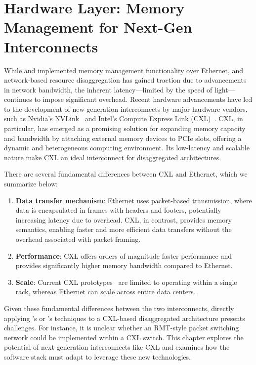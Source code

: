 \chapter{Hardware Layer: Memory Management for Next-Gen Interconnects}
\label{chap:hardware}
While \mind and \pulse implemented memory management functionality over Ethernet, and network-based resource disaggregation has gained traction due to advancements in network bandwidth, the inherent latency—limited by the speed of light—continues to impose significant overhead. Recent hardware advancements have led to the development of new-generation interconnects by major hardware vendors, such as Nvidia's NVLink~\cite{nvlink} and Intel's Compute Express Link (CXL)~\cite{cxl}. CXL, in particular, has emerged as a promising solution for expanding memory capacity and bandwidth by attaching external memory devices to PCIe slots, offering a dynamic and heterogeneous computing environment. Its low-latency and scalable nature make CXL an ideal interconnect for disaggregated architectures.

There are several fundamental differences between CXL and Ethernet, which we summarize below:
\begin{enumerate}[leftmargin=*, itemsep=0pt]
  \item \textbf{Data transfer mechanism}: Ethernet uses packet-based transmission, where data is encapsulated in frames with headers and footers, potentially increasing latency due to overhead. CXL, in contrast, provides memory semantics, enabling faster and more efficient data transfers without the overhead associated with packet framing.
  \item \textbf{Performance}: CXL offers orders of magnitude faster performance and provides significantly higher memory bandwidth compared to Ethernet.
  \item \textbf{Scale}: Current CXL prototypes~\cite{demystify,cxl2} are limited to operating within a single rack, whereas Ethernet can scale across entire data centers.
\end{enumerate}

Given these fundamental differences between the two interconnects, directly applying \mind's or \pulse's techniques to a CXL-based disaggregated architecture presents challenges. For instance, it is unclear whether an RMT-style packet switching network could be implemented within a CXL switch. This chapter explores the potential of next-generation interconnects like CXL and examines how the software stack must adapt to leverage these new technologies.

